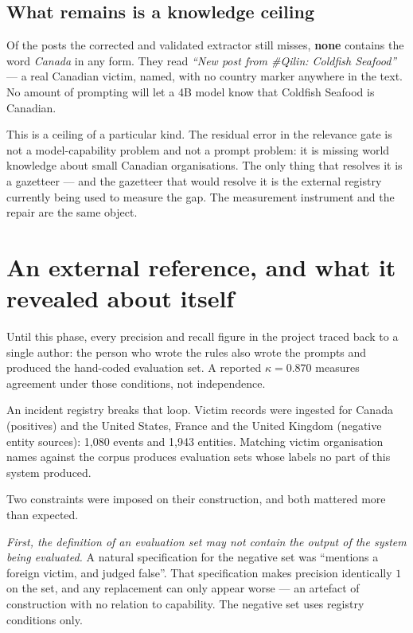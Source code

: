 \documentclass[11pt]{article}
\begin{document}
\subsection{What remains is a knowledge ceiling}

Of the posts the corrected and validated extractor still misses, \textbf{none}
contains the word \emph{Canada} in any form. They read \emph{``New post from
\#Qilin: Coldfish Seafood''} --- a real Canadian victim, named, with no country
marker anywhere in the text. No amount of prompting will let a 4B model know
that Coldfish Seafood is Canadian.

\begin{keybox}
This is a ceiling of a particular kind. The residual error in the relevance
gate is not a model-capability problem and not a prompt problem: it is missing
world knowledge about small Canadian organisations. The only thing that
resolves it is a gazetteer --- and the gazetteer that would resolve it is the
external registry currently being used to measure the gap. The measurement
instrument and the repair are the same object.
\end{keybox}

\section{An external reference, and what it revealed about itself}

Until this phase, every precision and recall figure in the project traced back
to a single author: the person who wrote the rules also wrote the prompts and
produced the hand-coded evaluation set. A reported $\kappa = 0.870$ measures
agreement under those conditions, not independence.

An incident registry breaks that loop. Victim records were ingested for Canada
(positives) and the United States, France and the United Kingdom (negative
entity sources): 1{,}080 events and 1{,}943 entities. Matching victim
organisation names against the corpus produces evaluation sets whose labels no
part of this system produced.

Two constraints were imposed on their construction, and both mattered more than
expected.

\emph{First, the definition of an evaluation set may not contain the output of
the system being evaluated.} A natural specification for the negative set was
``mentions a foreign victim, and  judged 
false''. That specification makes  precision identically $1$ on
the set, and any replacement can only appear worse --- an artefact of
construction with no relation to capability. The negative set uses registry
conditions only.
\end{document}
